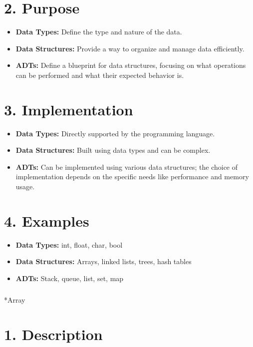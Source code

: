 \documentclass[
  letterpaper,
  DIV=11,
  numbers=noendperiod]{scrreprt}
\makeatletter
\let\oldsubparagraph\subparagraph
\renewcommand{\subparagraph}{
    \@ifstar
      \xxxSubParagraphStar
      \xxxSubParagraphNoStar
  }
\newcommand{\xxxSubParagraphStar}[1]{\oldsubparagraph*{#1}\mbox{}}
\newcommand{\xxxSubParagraphNoStar}[1]{\oldsubparagraph{#1}\mbox{}}
\providecommand{\tightlist}{%
  \setlength{\itemsep}{0pt}\setlength{\parskip}{0pt}}
\makeatother
\begin{document}
\section{2. Purpose}

\begin{itemize}
\tightlist
\item
  \textbf{Data Types:} Define the type and nature of the data.
\item
  \textbf{Data Structures:} Provide a way to organize and manage data
  efficiently.
\item
  \textbf{ADTs:} Define a blueprint for data structures, focusing on
  what operations can be performed and what their expected behavior is.
\end{itemize}

\section{3. Implementation}

\begin{itemize}
\tightlist
\item
  \textbf{Data Types:} Directly supported by the programming language.
\item
  \textbf{Data Structures:} Built using data types and can be complex.
\item
  \textbf{ADTs:} Can be implemented using various data structures; the
  choice of implementation depends on the specific needs like
  performance and memory usage.
\end{itemize}

\section{4. Examples}

\begin{itemize}
\tightlist
\item
  \textbf{Data Types:} int, float, char, bool
\item
  \textbf{Data Structures:} Arrays, linked lists, trees, hash tables
\item
  \textbf{ADTs:} Stack, queue, list, set, map
\end{itemize}

\subparagraph*{Array}\label{array}

\section{1. Description}
\end{document}
